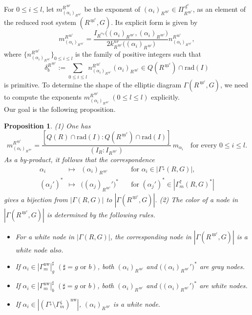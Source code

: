\documentclass[11pt]{amsart}
\newcommand{\dc}{\,\underline{\mathrm{d}}^c}
\newcommand{\mc}{\, \underline{\mathrm{m}}^c}
\newcommand{\nw}{\mathrm{nw}}
\newtheorem{prop}[thm]{Proposition}%
\begin{document}
{For $0\leq i\leq l$, let $m_{(\alpha_i)_{R^{\mc}}}^{R^{\mc}}$ be the exponent 
of $(\alpha_i)_{R^{\mc}}\in\Pi_{R^{\mc}}^{\dc}$, as an element of 
the reduced root system $(R^{\mc},G)$. Its explicit form is given by
\begin{equation}\label{eq:exponent-Rmc}
m_{(\alpha_i)_{R^{\mc}}}^{R^{\mc}}
=\dfrac{I_{R^{^mc}}\big((\alpha_i)_{R^{\mc}},(\alpha_i)_{R^{\mc}}\big)}
{2k_{R^{\mc}}^{nr}\big((\alpha_i)_{R^{\mc}}\big)}n_{(\alpha_i)_{R^{\mc}}}^{R^{\mc}},
\end{equation}
where $\big\{n_{(\alpha_i)_{R^{\mc}}}^{R^{\mc}}\big\}_{0\leq i\leq l}$ is the family
of positive integers such that
\[\delta_b^{R^{\mc}}:=\sum_{0\leq i\leq l} 
n_{(\alpha_i)_{R^{\mc}}}^{R^{\mc}} (\alpha_i)_{R^{\mc}}
\in Q(R^{\mc})\cap \mathrm{rad}(I)\]
is primitive. To determine the shape of the elliptic diagram $\Gamma(R^{\mc},G)$, 
we need to compute the exponents $m_{(\alpha_i)_{R^{\mc}}}^{R^{\mc}}\ (0\leq l\leq l)$
explicitly. \\

Our goal is the following proposition.
\begin{prop}\label{prop:Gamma(R'',G)}
{\rm (1)} One has
\[m^{R^{\mc}}_{(\alpha_i)_{R^{\mc}}}=
\dfrac{[Q(R)\cap \mathrm{rad}(I):Q(R^{\mc})\cap\mathrm{rad}(I)]}{(I_R:I_{R^{\mc}})}\,
m_{\alpha_i}\quad \text{for every }0\leq i\leq l. \]
As a by-product, it follows that the correspondence 
\[\begin{array}{lllllllll}
\alpha_i & \longmapsto &  (\alpha_i)_{R^{\mc}}\quad &\text{for }\alpha_i\in
|\Gamma^{\downarrow}(R,G)|,
\\[5pt]
(\alpha_j')^\ast & \longmapsto & \big((\alpha_j)_{R^{\mc}}'\big)^\ast \quad &\text{for }
(\alpha_j')^\ast\in |\Gamma_m^{\uparrow}(R,G)^\ast|
\end{array}\]
gives a bijection from $|\Gamma(R,G)|$ to $|\Gamma(R^{\mc},G)|$.
\vskip 1mm
\noindent
{\rm (2)} The color of a node in $|\Gamma(R^{\mc},G)|$ is determined by the following 
rules. 
\begin{itemize}
\item For a white node in $|\Gamma(R,G)|$, the corresponding node in 
$|\Gamma(R^{\mc},G)|$ is a white node also.
\item If $\alpha_i\in |\Gamma_m^\nw|_g^\sharp\,\, (\sharp=g \text{ or }b)$, both 
$(\alpha_i)_{R^{\mc}}$ and $\big((\alpha_i)_{R^{\mc}}'\big)^\ast$ are gray nodes.
\item If $\alpha_i\in |\Gamma_m^\nw|_b^\sharp\,\, (\sharp=g \text{ or }b)$, both 
$(\alpha_i)_{R^{\mc}}$ and $\big((\alpha_i)_{R^{\mc}}'\big)^\ast$ are white nodes. 
\item If $\alpha_i\in |(\Gamma^{\downarrow}\setminus 
\Gamma_m^{\downarrow})^\nw|$,  
$(\alpha_i)_{R^{\mc}}$ is a white node. 
\end{itemize}
\end{prop}
 
}
\end{document}
